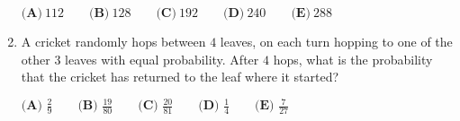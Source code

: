 \documentclass{article}
\begin{document}
\begin{enumerate}[label=\arabic*., itemsep=0.5em]
\(\textbf{(A)} ~112\qquad\textbf{(B)} ~128\qquad\textbf{(C)} ~192\qquad\textbf{(D)} ~240\qquad\textbf{(E)} ~288\)\par \vspace{0.5em}\item A cricket randomly hops between \(4\) leaves, on each turn hopping to one of the other \(3\) leaves with equal probability. After \(4\) hops, what is the probability that the cricket has returned to the leaf where it started?



\(\textbf{(A) }\frac{2}{9}\qquad\textbf{(B) }\frac{19}{80}\qquad\textbf{(C) }\frac{20}{81}\qquad\textbf{(D) }\frac{1}{4}\qquad\textbf{(E) }\frac{7}{27}\)\par \vspace{0.5em}
\end{enumerate}
\end{document}
